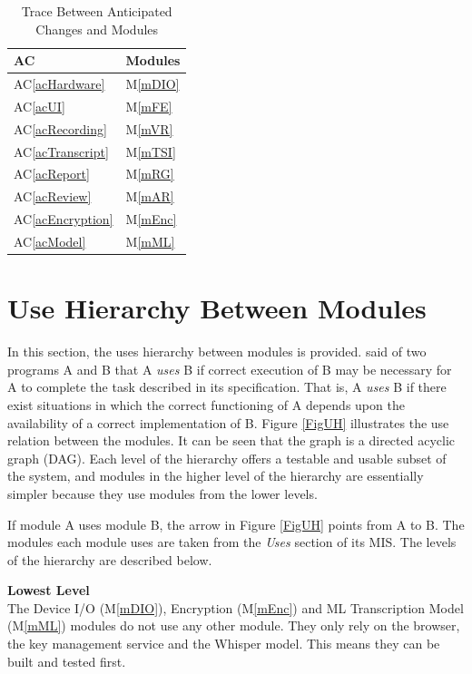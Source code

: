 \documentclass[12pt, titlepage]{article}
\newcommand{\acref}[1]{AC\ref{#1}}
\newcommand{\mref}[1]{M\ref{#1}}
\begin{document}
\begin{table}[H]
\caption{Trace Between Anticipated Changes and Modules}
\centering
\begin{tabular}{p{} p{}}
\toprule
\textbf{AC} & \textbf{Modules}\\
\midrule
\acref{acHardware} & \mref{mDIO}\\
\acref{acUI} & \mref{mFE}\\
\acref{acRecording} & \mref{mVR}\\
\acref{acTranscript} & \mref{mTSI}\\
\acref{acReport} & \mref{mRG}\\
\acref{acReview} & \mref{mAR}\\
\acref{acEncryption} & \mref{mEnc}\\
\acref{acModel} & \mref{mML}\\
\bottomrule
\end{tabular}
\label{TblACT}
\end{table}

\section{Use Hierarchy Between Modules} \label{SecUse}

In this section, the uses hierarchy between modules is
provided. \citet{Parnas1978} said of two programs A and B that A {\em uses} B if
correct execution of B may be necessary for A to complete the task described in
its specification. That is, A {\em uses} B if there exist situations in which
the correct functioning of A depends upon the availability of a correct
implementation of B.  Figure \ref{FigUH} illustrates the use relation between
the modules. It can be seen that the graph is a directed acyclic graph
(DAG). Each level of the hierarchy offers a testable and usable subset of the
system, and modules in the higher level of the hierarchy are essentially simpler
because they use modules from the lower levels.

If module A uses module B, the arrow in Figure \ref{FigUH} points from A to B. The modules each module uses are taken from the \emph{Uses} section of its MIS. The levels of the hierarchy are described below.

\vspace{\baselineskip}
\noindent \textbf{Lowest Level}\\
The Device I/O (\mref{mDIO}), Encryption (\mref{mEnc}) and ML Transcription Model (\mref{mML}) modules do not use any other module. They only rely on the browser, the key management service and the Whisper model. This means they can be built and tested first.
\end{document}
